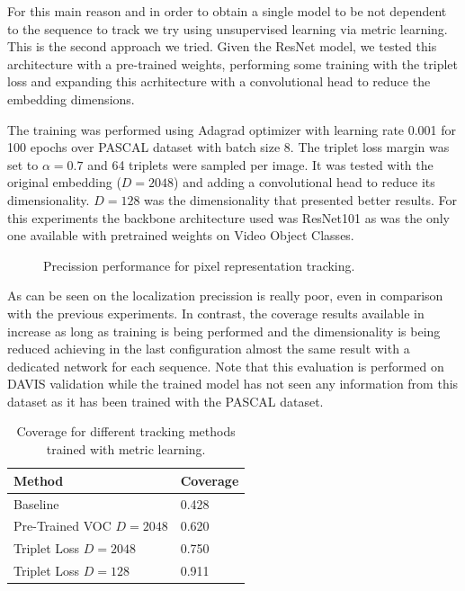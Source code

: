 For this main reason and in order to obtain a single model to be not dependent to the sequence to track we try using unsupervised learning via metric learning. This is the second approach we tried.
Given the ResNet model, we tested this architecture with a pre-trained weights, performing some training with the triplet loss and expanding this acrhitecture with a convolutional head to reduce the embedding dimensions.

The training was performed using Adagrad optimizer with learning rate 0.001 for 100 epochs over PASCAL dataset with batch size 8. The triplet loss margin was set to $\alpha = 0.7$ and 64 triplets were sampled per image.
It was tested with the original embedding ($D=2048$) and adding a convolutional head to reduce its dimensionality.
$D=128$ was the dimensionality that presented better results. For this experiments the backbone architecture used was ResNet101 as was the only one available with pretrained weights on Video Object Classes.


\begin{figure}[h]
  \centering
  
  \label{fig:tracking_metric_learning}
  \caption{Precission performance for pixel representation tracking.}
\end{figure}

As can be seen on  the localization precission is really poor, even in comparison with the previous experiments.
In contrast, the coverage results available in  increase as long as training is being performed and the dimensionality is being reduced achieving in the last configuration almost the same result with a dedicated network for each sequence.
Note that this evaluation is performed on DAVIS validation while the trained model has not seen any information from this dataset as it has been trained with the PASCAL dataset.


\begin{table}[h]
  \centering
  \begin{tabular}{l|l}
    \toprule
    Method                       & Coverage \\
    \midrule
    Baseline                     & 0.428    \\
    Pre-Trained VOC $D=2048$     & 0.620    \\
    Triplet Loss $D=2048$        & 0.750    \\
    Triplet Loss $D=128$         & 0.911    \\
    \bottomrule
  \end{tabular}
  \caption{Coverage for different tracking methods trained with metric learning. }
  \label{tab:coverage_tracking_metric_learning}
\end{table}

